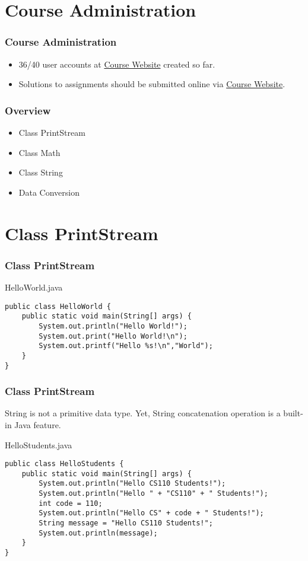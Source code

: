 \documentclass[10pt, compress]{beamer}
\begin{document}
\prepareCover

\section{Course Administration}

\begin{frame}[fragile]
\frametitle{Course Administration}
	\begin{itemize}
		\item[] 36/40 user accounts at \href{http://www.ghorbanzade.com}{Course Website} created so far.
		\item[] Solutions to assignments should be submitted online via \href{http://www.ghorbanzade.com}{Course Website}.
	\end{itemize}
\end{frame}

\begin{frame}[fragile]
	\frametitle{Overview}
	\begin{itemize}
		\item[] Class PrintStream
		\item[] Class Math
		\item[] Class String
		\item[] Data Conversion
	\end{itemize}
\end{frame}

\section{Class PrintStream}

\begin{frame}[fragile]
	\frametitle{Class PrintStream}
	\begin{block}{HelloWorld.java}
		\begin{verbatim}
public class HelloWorld {
    public static void main(String[] args) {
        System.out.println("Hello World!");
        System.out.print("Hello World!\n");
        System.out.printf("Hello %s!\n","World");
    }
}
		\end{verbatim}
	\end{block}
\end{frame}

\begin{frame}[fragile]
	\frametitle{Class PrintStream}
	String is not a primitive data type. Yet, String concatenation operation is a built-in Java feature.
	\begin{block}{HelloStudents.java}
	\begin{verbatim}
public class HelloStudents {
    public static void main(String[] args) {
        System.out.println("Hello CS110 Students!");
        System.out.println("Hello " + "CS110" + " Students!");
        int code = 110;
        System.out.println("Hello CS" + code + " Students!");
        String message = "Hello CS110 Students!";
        System.out.println(message);
    }
}
	\end{verbatim}
	\end{block}
\end{frame}
\end{document}

